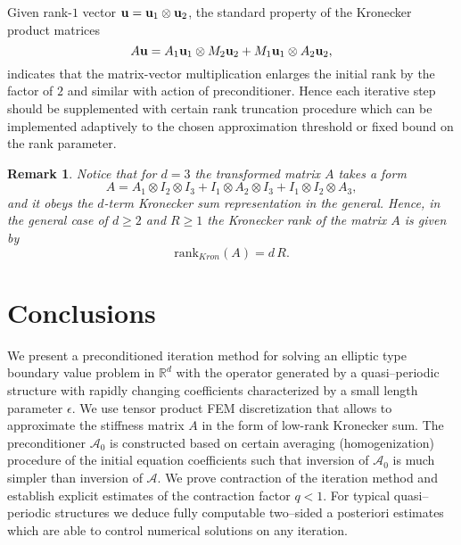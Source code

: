 \documentclass[amstex,amstext,amsfonts,epsf,12pt] {amsart}
\newcommand{\cred}{\color{red}}
\newcommand{\cn}{\color{black}}
\newtheorem{remark}[theorem]{Remark}
\newcommand\ben{\begin{eqnarray}}
\newcommand\een{\end{eqnarray}}
\def\ben{\begin{eqnarray}}
\def\een{\end{eqnarray}}
\begin{document}
Given rank-$1$ vector ${\bf u}={\bf u}_1 \otimes {\bf u}_2$,
the standard property of the Kronecker product matrices 
\[
 {A}{\bf u} = {A}_1{\bf u}_1 \otimes M_2 {\bf u}_2 + M_1 {\bf u}_1 \otimes {A}_2 {\bf u}_2,
\]
indicates that the matrix-vector multiplication enlarges the initial rank by the factor of $2$
and similar with action of preconditioner.
Hence each iterative step should be supplemented with certain rank truncation procedure
which can be implemented adaptively to the chosen approximation threshold or fixed bound
on the rank parameter. 



\begin{remark}\label{rem:Matr_general_d}
Notice that for $d=3$ the transformed matrix $A$ takes a form
\[ %
A = A_1 \otimes I_2\otimes I_3 + I_1 \otimes A_2 \otimes I_3 + I_1 \otimes I_2\otimes A_3,
\]  %
and it obeys the $d$-term Kronecker sum representation in the general.
Hence, in the general case of $d\geq 2$ and $R\geq 1$ the Kronecker rank of the 
matrix ${A}$ is given by
\[
 \mbox{rank}_{Kron} ({A})= d \, R.
\]
\end{remark}

\section{Conclusions}\label{sec:Conclusions}

We present a preconditioned iteration method for solving an elliptic type boundary value problem
in $\mathbb{R}^d$
with the operator generated by a quasi--periodic structure
with rapidly changing coefficients characterized by a small length parameter $\epsilon$. 
We use tensor product FEM discretization
that allows to approximate the stiffness matrix $A$ in the form of low-rank Kronecker sum.
The preconditioner $\mathcal{A}_0$
is constructed based on certain averaging (homogenization) procedure of the initial
equation coefficients such that inversion of $\mathcal{A}_0$ is much simpler 
than inversion of $\mathcal{A}$. 
We prove contraction of the iteration method and establish explicit estimates of the contraction
factor $q<1$.
For typical quasi--periodic structures we deduce fully computable two--sided a 
posteriori estimates which are able to control numerical solutions on any iteration.
\end{document}
